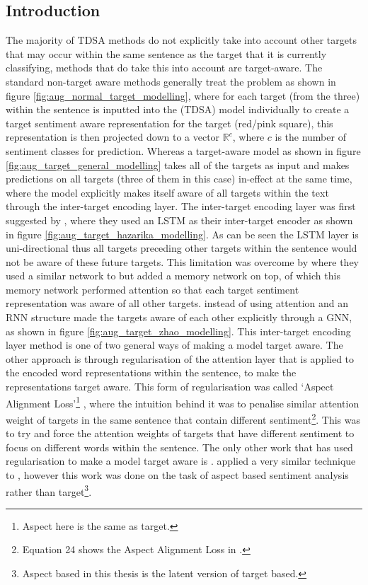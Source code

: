 \subsection{Introduction}
The majority of TDSA methods do not explicitly take into account other targets that may occur within the same sentence as the target that it is currently classifying, methods that do take this into account are target-aware. The standard non-target aware methods generally treat the problem as shown in figure \ref{fig:aug_normal_target_modelling}, where for each target (from the three) within the sentence is inputted into the (TDSA) model individually to create a target sentiment aware representation for the target (red/pink square), this representation is then projected down to a vector $\mathbb{R}^{c}$, where $c$ is the number of sentiment classes for prediction. Whereas a target-aware model as shown in figure \ref{fig:aug_target_general_modelling} takes all of the targets as input and makes predictions on all targets (three of them in this case) in-effect at the same time, where the model explicitly makes itself aware of all targets within the text through the inter-target encoding layer. The inter-target encoding layer was first suggested by \citet{hazarika-etal-2018-modeling}, where they used an LSTM as their inter-target encoder as shown in figure \ref{fig:aug_target_hazarika_modelling}. As can be seen the LSTM layer is uni-directional thus all targets preceding other targets within the sentence would not be aware of these future targets. This limitation was overcome by \citet{majumder-etal-2018-iarm} where they used a similar network to \citet{hazarika-etal-2018-modeling} but added a memory network on top, of which this memory network performed attention so that each target sentiment representation was aware of all other targets. \citet{zhao2019modeling} instead of using attention and an RNN structure made the targets aware of each other explicitly through a GNN, as shown in figure \ref{fig:aug_target_zhao_modelling}. This inter-target encoding layer method is one of two general ways of making a model target aware. The other approach is through regularisation of the attention layer \citep{fan-etal-2018-multi} that is applied to the encoded word representations within the sentence, to make the representations target aware. This form of regularisation was called `Aspect Alignment Loss'\footnote{Aspect here is the same as target.} \citep{fan-etal-2018-multi}, where the intuition behind it was to penalise similar attention weight of targets in the same sentence that contain different sentiment\footnote{Equation 24 shows the Aspect Alignment Loss in \citet{fan-etal-2018-multi}.}. This was to try and force the attention weights of targets that have different sentiment to focus on different words within the sentence. The only other work that has used regularisation to make a model target aware is \citet{hu-etal-2019-constrained}. \citet{hu-etal-2019-constrained} applied a very similar technique to \citet{fan-etal-2018-multi}, however this work was done on the task of aspect based sentiment analysis rather than target\footnote{Aspect based in this thesis is the latent version of target based.}.

